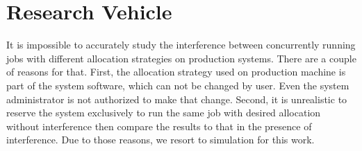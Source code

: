 \documentclass[conference]{IEEEtran}
\begin{document}
%
%
%       






\section{Research Vehicle}
\label{sec:codes}

It is impossible to accurately study the interference between concurrently running jobs with different allocation strategies on production systems. There are a couple of reasons for that. First, the allocation strategy used on production machine is part of the system software, which can not be changed by user. Even the system administrator is not authorized to make that change. Second, it is unrealistic to reserve the system exclusively to run the same job with desired allocation without interference then compare the results to that in the presence of interference. Due to those reasons, we resort to simulation for this work.
\end{document}
